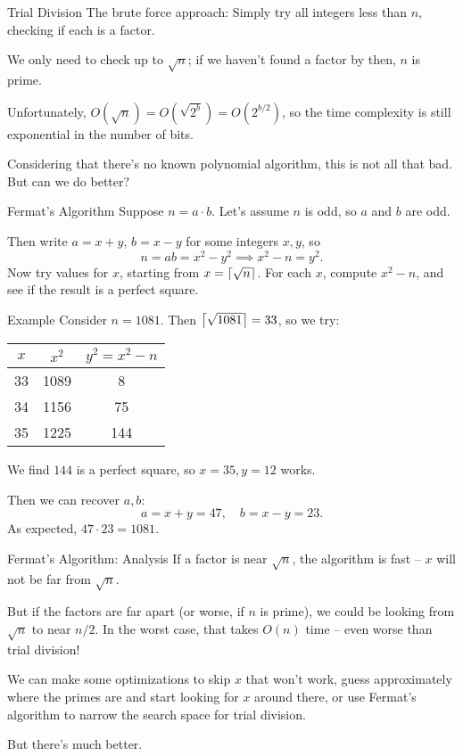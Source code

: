\documentclass[aspectratio=169]{beamer}
\begin{document}
\begin{frame}{Trial Division}
  The brute force approach: Simply try all integers less than $n$, checking if each is a factor.

  We only need to check up to $\sqrt{n}$;
  if we haven't found a factor by then, $n$ is prime. \pause

  Unfortunately, $O(\sqrt{n}) = O(\sqrt{2^b}) = O(2^{b/2})$, so the time complexity
  is still exponential in the number of bits. \pause

  Considering that there's no known polynomial algorithm, this is not all that bad.
  But can we do better?
\end{frame}

\begin{frame}{Fermat's Algorithm}
  Suppose $n = a \cdot b$. Let's assume $n$ is odd, so $a$ and $b$ are odd. \pause

  Then write $a = x+y$, $b = x-y$ for some integers $x, y$, so
  $$n = ab = x^2 - y^2 \implies x^2 - n = y^2.$$ \pause
  Now try values for $x$, starting from $x = \left\lceil \sqrt{n} \right\rceil$.
  For each $x$, compute $x^2 - n$, and see if the result is a perfect square.

\end{frame}

\begin{frame}{Example}
  Consider $n = 1081$. Then $\left\lceil \sqrt{1081} \right\rceil = 33$, so we try: \pause
  \begin{center}
  \begin{tabular}{c|c|c}
    $x$ & $x^2$ & $y^2 = x^2 - n$ \\
    \hline
    33 & 1089 & 8 \\
    34 & 1156 & 75 \\
    35 & 1225 & 144 \\
  \end{tabular}
  \end{center} \pause
  We find $144$ is a perfect square, so $x = 35, y = 12$ works. \pause

  Then we can recover $a, b$:
  $$a = x + y = 47, \quad b = x - y = 23.$$ \pause
  As expected, $47 \cdot 23 = 1081$.
\end{frame}

\begin{frame}{Fermat's Algorithm: Analysis}
  If a factor is near $\sqrt{n}$, the algorithm is fast -- $x$ will not be far from $\sqrt{n}$.
  \pause

  But if the factors are far apart (or worse, if $n$ is prime), we could be looking
  from $\sqrt{n}$ to near $n/2$.
  In the worst case, that takes $O(n)$ time -- even worse than trial division!
  \pause

  We can make some optimizations to skip $x$ that won't work,
  guess approximately where the primes are and start looking for $x$
  around there, or use Fermat's algorithm to narrow the search space
  for trial division.
  \pause

  But there's much better.
\end{frame}
\end{document}
